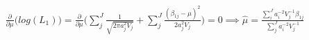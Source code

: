 \begin{multline}
\frac{\partial}{\partial \mu}\Big(log(L_1)\Big) =
\frac{\partial}{\partial \mu} \Big(\sum\limits_j^J \frac{1}{\sqrt{2 \pi a_j^2 V_j}} + \sum\limits_j^J \frac{(\beta_{1j} - \mu)^2}{2 a_j^2V_j}\Big) = 0
\implies \hat{\mu} = \frac{\sum\limits_i^J a_i^{-2}V_j^{-1}\beta_{1j}}{\sum\limits_j^J a_i^{-2}V_j^{-1}}
\end{multline}